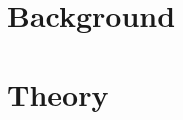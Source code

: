 \documentclass[12pt,a4paper]{report}
\author{
	Sørensen, Casper\\
	\texttt{csare12@student.aau.dk}
	\and
	Christensen, Daniel\\
	\textttt{12@student.aau.dk}
	\and
	Smed, Dina Madsen\\
	\textttt{dsmed12@student.aau.dk}
	\and
	Lind, Rasmus Bloustrød\\
	\textttt{rlind12@student.aau.dk}
	\and
	Vinkel, Simone Patricia \\
	\texttt{svinke12@student.aau.dk}
	Høeg, Emil Rose \\
	\texttt{ehaeg12@student.aau.dk}
	Nilsson, Sam Alix \\
	\texttt{snilss12@student.aau.dk}
}
\begin{document}
\tableofcontents
\chapter{Background}



%

\chapter{Theory}







\end{document}
